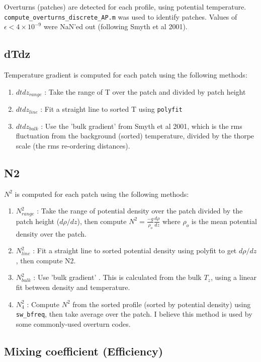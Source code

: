 \documentclass[11pt]{article}
\begin{document}
Overturns (patches) are detected for each profile, using potential temperature. \verb+compute_overturns_discrete_AP.m+ was used to identify patches. Values of $\epsilon <4\times 10^{-9}$ were NaN'ed out (following Smyth et al 2001). 

\subsection{dTdz}

Temperature gradient is computed for each patch using the following methods:
\begin{enumerate}
\item $dtdz_{range}$ : Take the range of T over the patch and divided by patch height
\item $dtdz_{line}$ : Fit a straight line to sorted T using \verb+polyfit+
\item $dtdz_{bulk}$ : Use the 'bulk gradient' from Smyth et al 2001, which is the rms fluctuation from the background (sorted) temperature, divided by the thorpe scale (the rms re-ordering distances).
\end{enumerate}


\subsection{N2}

$N^2$ is computed for each patch using the following methods:
\begin{enumerate}
\item $N^2_{range}$ : Take the range of potential density over the patch divided by the patch height ($d\rho/dz$), then compute $N^2=\frac{-g}{\rho_o}\frac{d\rho}{dz}$ where $\rho_o$ is the mean potential density over the patch.
\item $N^2_{line}$ : Fit a straight line to sorted potential density using polyfit to get $d\rho/dz$, then compute N2.
\item $N^2_{bulk}$ : Use 'bulk gradient' . This is calculated from the bulk $T_z$, using a linear fit between density and temperature.
\item $N^2_4$ : Compute $N^2$ from the sorted profile (sorted by potential density) using \verb+sw_bfreq+, then take average over the patch. I believe this method is used by some commonly-used overturn codes.
\end{enumerate}


\subsection{Mixing coefficient (Efficiency)}
\end{document}

